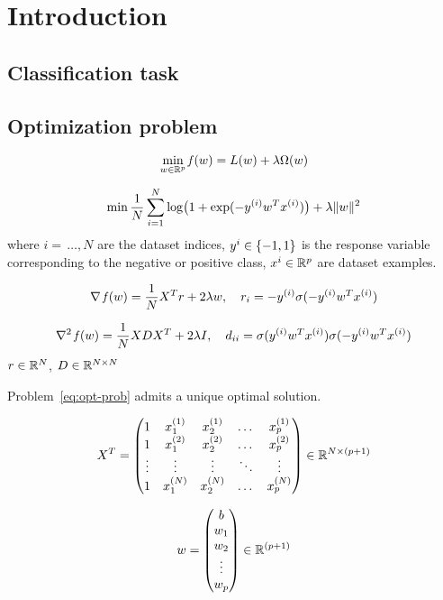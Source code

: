 \section{Introduction}\label{sc:intro}


\subsection{Classification task}

\subsection{Optimization problem}

\[
\min_{w\in\mathbb{R}^p}\operatorname*{\mathit{f}}(w)=L(w)+\lambda\Omega(w)
\]


\begin{equation}\label{eq:opt-prob}
\min\frac{1}{N}\sum_{i=1}^N\log\bigl(1+\exp(-y^{(i)}w^Tx^{(i)})\bigr)+\lambda\lVert w\rVert^2
\end{equation}
where $i=\,\dots,N$ are the dataset indices, $y^{i}\in\{-1,1\}$ is the response variable corresponding to the negative or positive class, $x^{i}\in\mathbb{R}^p$ are dataset examples.

\[
\nabla\operatorname*{\mathit{f}}(w)=\frac{1}{N}X^Tr+2\lambda w,\quad r_i=-y^{(i)}\sigma(-y^{(i)}w^Tx^{(i)})
\]

\[
\nabla^2\operatorname*{\mathit{f}}(w)=\frac{1}{N}XDX^T+2\lambda I,\quad d_{ii}=\sigma(y^{(i)}w^Tx^{(i)})\sigma(-y^{(i)}w^Tx^{(i)})
\]
$r\in\mathbb{R}^N$, $D\in\mathbb{R}^{N\times N}$

\begin{prop}
Problem~\eqref{eq:opt-prob} admits a unique optimal solution.
\end{prop}

\[
X^T=
\begin{pmatrix}
1 & x_1^{(1)} & x_2^{(1)} & \dots & x_p^{(1)} \\
1 & x_1^{(2)} & x_2^{(2)} & \dots & x_p^{(2)} \\
\vdots & \vdots & \vdots & \ddots & \vdots \\
1 & x_1^{(N)} & x_2^{(N)} & \dots & x_p^{(N)}
\end{pmatrix}\in\mathbb{R}^{N\times(p+1)}
\]

\[
w=
\begin{pmatrix}
b \\ w_1 \\ w_2 \\ \vdots \\ w_p
\end{pmatrix}\in\mathbb{R}^{(p+1)}
\]

